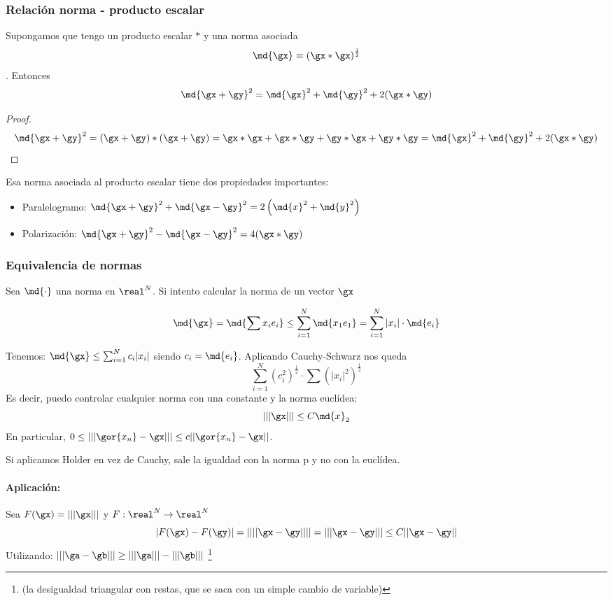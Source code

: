 \documentclass{apuntes}
\begin{document}
\subsubsection{Relación norma - producto escalar}
\label{secNormaprodEsc}
\begin{theorem}
Supongamos que tengo un producto escalar $\ast$ y una norma asociada \[ \md{\gx} = (\gx\ast \gx) ^ {\frac{1}{2}}\]. Entonces \[ \md{\gx + \gy}^ 2 =  \md{\gx} ^ 2 + \md{\gy} ^ 2+2(\gx\ast\gy) \]
\end{theorem}

\begin{proof}
\[ \md{\gx+\gy}^2 = (\gx+\gy)\ast(\gx+\gy) = \gx \ast \gx + \gx \ast \gy + \gy \ast \gx + \gy \ast \gy=\md{\gx} ^ 2 + \md{\gy} ^ 2+2(\gx\ast\gy) \]
\end{proof}

Esa norma asociada al producto escalar tiene dos propiedades importantes:
\begin{itemize}
\item Paralelogramo: $\md{\gx+\gy}^ 2 + \md{\gx-\gy} ^ 2 = 2\left(\md{x}^2+\md{y}^2\right) $
\item Polarización: $\md{\gx+\gy} ^ 2 - \md{\gx-\gy} ^ 2 = 4(\gx*\gy)$
\end{itemize}


\subsubsection{Equivalencia de normas}
Sea $\md{\cdot}$ una norma en $\real^N$. Si intento calcular la norma de un vector $\gx$

\[ \md{\gx} = \md{\sum x_i e_i} \leq \sum_{i=1}^N \md{x_1 e_1} = \sum_{i=1}^N|x_i|\cdot\md{e_i} \]

Tenemos: $\md{\gx} \leq \sum_{i=1}^N c_i |x_i|$ siendo $c_i = \md{e_i}$. Aplicando Cauchy-Schwarz  nos queda
\[ \sum_{i=1}^N \left(c_i^2\right)^\frac{1}{2} \cdot \sum \left(|x_i|^2\right)^\frac{1}{2} \]
Es decir, puedo controlar cualquier norma con una constante y la norma euclídea:
$$|||\gx||| \leq C \md{x}_{2}$$
En particular, $0 \leq |||\gor{x_n} - \gx|||\leq c ||\gor{x_n}-\gx||$. 

\begin{remark}
Si aplicamos Holder en vez de Cauchy, sale la igualdad con la norma p y no con la euclídea.
\end{remark}

\paragraph{Aplicación:}
Sea $F(\gx) = |||\gx|||$ y $F:\real^N \rightarrow \real^N$ 
$$|F(\gx)-F(\gy)| = \left| |||\gx - \gy||| \right| = |||\gx - \gy||| \leq C ||\gx - \gy||$$
Utilizando: $|||\ga-\gb||| \ge |||\ga||| - |||\gb|||$ \footnote{(la desigualdad triangular con restas, que se saca con un simple cambio de variable)}
\end{document}
